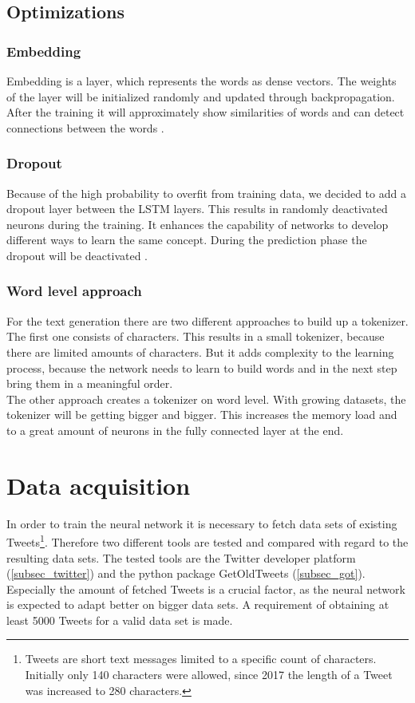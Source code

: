 \documentclass[hidelinks, conference]{IEEEtran}
\begin{document}
\subsection{Optimizations}

\subsubsection{Embedding}

Embedding is a layer, which represents the words as dense vectors. The weights of the layer will be initialized randomly and updated through backpropagation. After the training it will approximately show similarities of words and can detect connections between the words \cite{tim4}.

\subsubsection{Dropout}

Because of the high probability to overfit from training data, we decided to add a dropout layer between the LSTM layers. This results in randomly deactivated neurons during the training. It enhances the capability of networks to develop different ways to learn the same concept. During the prediction phase the dropout will be deactivated \cite{tim5}.

\subsubsection{Word level approach}

For the text generation there are two different approaches to build up a tokenizer. The first one consists of characters. This results in a small tokenizer, because there are limited amounts of characters. But it adds complexity to the learning process, because the network needs to learn to build words and in the next step bring them in a meaningful order.\\
The other approach creates a tokenizer on word level. With growing datasets, the tokenizer will be getting bigger and bigger. This increases the memory load and to a great amount of neurons in the fully connected layer at the end.

\section{Data acquisition}

In order to train the neural network it is necessary to fetch data sets of existing Tweets\footnote{Tweets are short text messages limited to a specific count of characters. Initially only 140 characters were allowed, since 2017 the length of a Tweet was increased to 280 characters.}. Therefore two different tools are tested and compared with regard to the resulting data sets. The tested tools are the Twitter developer platform \cite{twidev} (\ref{subsec_twitter}) and the python package GetOldTweets \cite{got} (\ref{subsec_got}). Especially the amount of fetched Tweets  is a crucial factor, as the neural network is expected to adapt better on bigger data sets. A requirement of obtaining at least 5000 Tweets for a valid data set is made.\\
\end{document}
